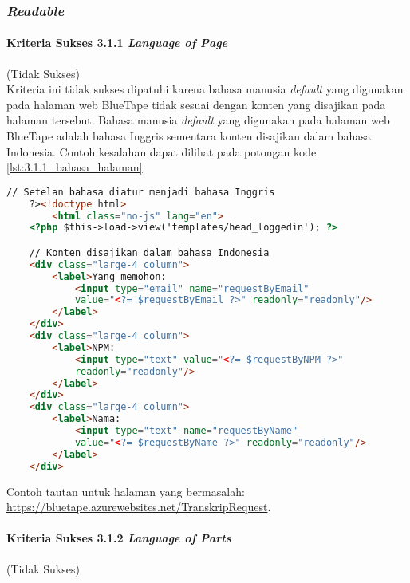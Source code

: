 \subsubsection{\textit{Readable}}
\label{subsubsec:kepatuhan_bluetape_readable}

\paragraph{Kriteria Sukses 3.1.1 \textit{Language of Page}}
\label{par:kepatuhan_bluetape_kriteria_sukses_3.1.1}
(Tidak Sukses)\\

Kriteria ini tidak sukses dipatuhi karena bahasa manusia \textit{default} yang digunakan pada halaman web BlueTape tidak sesuai dengan konten yang disajikan pada halaman tersebut. Bahasa manusia \textit{default} yang digunakan pada halaman web BlueTape adalah bahasa Inggris sementara konten disajikan dalam bahasa Indonesia. Contoh kesalahan dapat dilihat pada potongan kode \ref{lst:3.1.1_bahasa_halaman}.

\begin{lstlisting}[frame=single, label={lst:3.1.1_bahasa_halaman}, language=HTML, caption=Kriteria Sukses 3.1.1 - Bahasa yang Tidak Sesuai]
    // Setelan bahasa diatur menjadi bahasa Inggris
    ?><!doctype html>
        <html class="no-js" lang="en">
    <?php $this->load->view('templates/head_loggedin'); ?>

    // Konten disajikan dalam bahasa Indonesia
    <div class="large-4 column">
        <label>Yang memohon:
            <input type="email" name="requestByEmail" 
            value="<?= $requestByEmail ?>" readonly="readonly"/>
        </label>
    </div>
    <div class="large-4 column">
        <label>NPM:
            <input type="text" value="<?= $requestByNPM ?>" 
            readonly="readonly"/>
        </label>
    </div>
    <div class="large-4 column">
        <label>Nama:
            <input type="text" name="requestByName" 
            value="<?= $requestByName ?>" readonly="readonly"/>
        </label>
    </div>
\end{lstlisting}
Contoh tautan untuk halaman yang bermasalah: \url{https://bluetape.azurewebsites.net/TranskripRequest}.

\paragraph{Kriteria Sukses 3.1.2 \textit{Language of Parts}}
\label{par:kepatuhan_bluetape_kriteria_sukses_3.1.2}
(Tidak Sukses)\\

